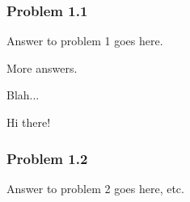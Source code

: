 \documentclass[12pt,letterpaper]{article}
\newcommand\hwnum{1}                  %
\newenvironment{answer}[1]{
  \subsubsection*{Problem \hwnum.#1}
}{\newpage}
\begin{document}
\begin{answer}{1}
Answer to problem 1 goes here.

More answers.

Blah...

Hi there!
\end{answer}

\begin{answer}{2}
Answer to problem 2 goes here, etc.
\end{answer}
\end{document}
